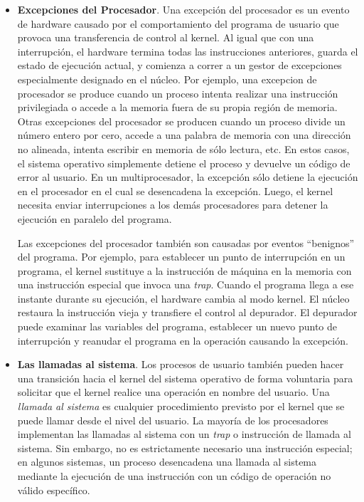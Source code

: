 \documentclass[10pt]{book}
\begin{document}
\begin{itemize}
\item \textbf{Excepciones del Procesador}. Una excepción del procesador es un evento de hardware causado por el comportamiento del programa de usuario que provoca una transferencia de control al kernel. Al igual que con una interrupción, el hardware termina todas las instrucciones anteriores, guarda el estado de ejecución actual, y comienza a correr a un gestor de excepciones especialmente designado en el núcleo. Por ejemplo, una excepcion de procesador se produce cuando un proceso intenta realizar una instrucción privilegiada o accede a la memoria fuera de su propia región de memoria. Otras excepciones del procesador se producen cuando un proceso divide un número entero  por cero, accede a una palabra de memoria con una dirección no alineada, intenta escribir en memoria de sólo lectura, etc. En estos casos, el sistema operativo simplemente detiene el proceso y devuelve un código de error al usuario. En un multiprocesador, la excepción sólo detiene la ejecución en el procesador en el cual se desencadena la excepción. Luego, el kernel necesita enviar interrupciones a los demás procesadores para detener la ejecución en paralelo del programa.

Las excepciones del procesador también son causadas por eventos ``benignos'' del programa. Por ejemplo, para establecer un punto de interrupción en un programa, el kernel sustituye a la instrucción de máquina en la memoria con una instrucción especial que invoca una \textit{trap}. Cuando el programa llega a ese instante durante su ejecución, el hardware cambia al modo kernel. El núcleo restaura la instrucción vieja y transfiere el control al depurador. El depurador puede examinar las variables del programa, establecer un nuevo punto de interrupción y reanudar el programa en la operación causando la excepción.

\item \textbf{Las llamadas al sistema}. Los procesos de usuario también pueden hacer una transición hacia el kernel del sistema operativo de forma voluntaria para solicitar que el kernel realice una operación en nombre del usuario. Una \textit{llamada al sistema} es cualquier procedimiento previsto por el kernel que se puede llamar desde el nivel del usuario. La mayoría de los procesadores implementan las llamadas al sistema con un \textit{trap} o instrucción de llamada al sistema. Sin embargo, no es estrictamente necesario una instrucción especial; en algunos sistemas, un proceso desencadena una llamada al sistema mediante la ejecución de una instrucción con un código de operación no válido específico.


\end{itemize}
\end{document}
